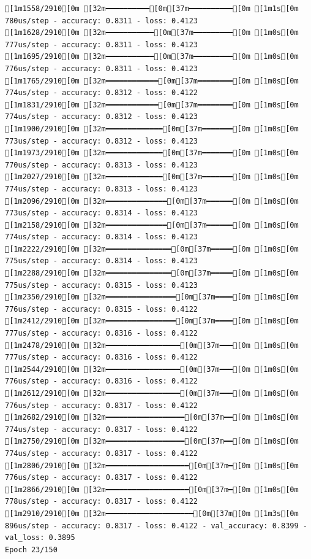 \documentclass[
  letterpaper,
  DIV=11,
  numbers=noendperiod]{scrartcl}
\begin{document}
\begin{verbatim}
[1m1558/2910[0m [32m━━━━━━━━━━[0m[37m━━━━━━━━━━[0m [1m1s[0m 780us/step - accuracy: 0.8311 - loss: 0.4123
[1m1628/2910[0m [32m━━━━━━━━━━━[0m[37m━━━━━━━━━[0m [1m0s[0m 777us/step - accuracy: 0.8311 - loss: 0.4123
[1m1695/2910[0m [32m━━━━━━━━━━━[0m[37m━━━━━━━━━[0m [1m0s[0m 776us/step - accuracy: 0.8311 - loss: 0.4123
[1m1765/2910[0m [32m━━━━━━━━━━━━[0m[37m━━━━━━━━[0m [1m0s[0m 774us/step - accuracy: 0.8312 - loss: 0.4122
[1m1831/2910[0m [32m━━━━━━━━━━━━[0m[37m━━━━━━━━[0m [1m0s[0m 774us/step - accuracy: 0.8312 - loss: 0.4123
[1m1900/2910[0m [32m━━━━━━━━━━━━━[0m[37m━━━━━━━[0m [1m0s[0m 773us/step - accuracy: 0.8312 - loss: 0.4123
[1m1973/2910[0m [32m━━━━━━━━━━━━━[0m[37m━━━━━━━[0m [1m0s[0m 770us/step - accuracy: 0.8313 - loss: 0.4123
[1m2027/2910[0m [32m━━━━━━━━━━━━━[0m[37m━━━━━━━[0m [1m0s[0m 774us/step - accuracy: 0.8313 - loss: 0.4123
[1m2096/2910[0m [32m━━━━━━━━━━━━━━[0m[37m━━━━━━[0m [1m0s[0m 773us/step - accuracy: 0.8314 - loss: 0.4123
[1m2158/2910[0m [32m━━━━━━━━━━━━━━[0m[37m━━━━━━[0m [1m0s[0m 774us/step - accuracy: 0.8314 - loss: 0.4123
[1m2222/2910[0m [32m━━━━━━━━━━━━━━━[0m[37m━━━━━[0m [1m0s[0m 775us/step - accuracy: 0.8314 - loss: 0.4123
[1m2288/2910[0m [32m━━━━━━━━━━━━━━━[0m[37m━━━━━[0m [1m0s[0m 775us/step - accuracy: 0.8315 - loss: 0.4123
[1m2350/2910[0m [32m━━━━━━━━━━━━━━━━[0m[37m━━━━[0m [1m0s[0m 776us/step - accuracy: 0.8315 - loss: 0.4122
[1m2412/2910[0m [32m━━━━━━━━━━━━━━━━[0m[37m━━━━[0m [1m0s[0m 777us/step - accuracy: 0.8316 - loss: 0.4122
[1m2478/2910[0m [32m━━━━━━━━━━━━━━━━━[0m[37m━━━[0m [1m0s[0m 777us/step - accuracy: 0.8316 - loss: 0.4122
[1m2544/2910[0m [32m━━━━━━━━━━━━━━━━━[0m[37m━━━[0m [1m0s[0m 776us/step - accuracy: 0.8316 - loss: 0.4122
[1m2612/2910[0m [32m━━━━━━━━━━━━━━━━━[0m[37m━━━[0m [1m0s[0m 776us/step - accuracy: 0.8317 - loss: 0.4122
[1m2682/2910[0m [32m━━━━━━━━━━━━━━━━━━[0m[37m━━[0m [1m0s[0m 774us/step - accuracy: 0.8317 - loss: 0.4122
[1m2750/2910[0m [32m━━━━━━━━━━━━━━━━━━[0m[37m━━[0m [1m0s[0m 774us/step - accuracy: 0.8317 - loss: 0.4122
[1m2806/2910[0m [32m━━━━━━━━━━━━━━━━━━━[0m[37m━[0m [1m0s[0m 776us/step - accuracy: 0.8317 - loss: 0.4122
[1m2866/2910[0m [32m━━━━━━━━━━━━━━━━━━━[0m[37m━[0m [1m0s[0m 778us/step - accuracy: 0.8317 - loss: 0.4122
[1m2910/2910[0m [32m━━━━━━━━━━━━━━━━━━━━[0m[37m[0m [1m3s[0m 896us/step - accuracy: 0.8317 - loss: 0.4122 - val_accuracy: 0.8399 - val_loss: 0.3895
Epoch 23/150


\end{verbatim}
\end{document}
